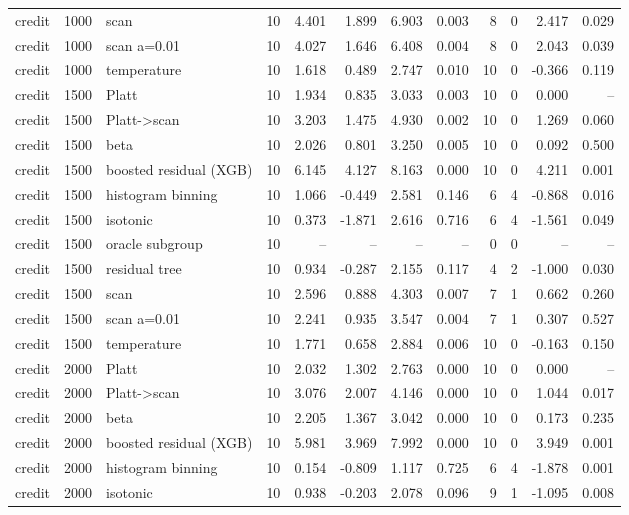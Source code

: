 \begin{tabular}{lllrrrrrrrrr}
credit & 1000 & scan & 10 & 4.401 & 1.899 & 6.903 & 0.003 & 8 & 0 & 2.417 & 0.029 \\
credit & 1000 & scan a=0.01 & 10 & 4.027 & 1.646 & 6.408 & 0.004 & 8 & 0 & 2.043 & 0.039 \\
credit & 1000 & temperature & 10 & 1.618 & 0.489 & 2.747 & 0.010 & 10 & 0 & -0.366 & 0.119 \\
credit & 1500 & Platt & 10 & 1.934 & 0.835 & 3.033 & 0.003 & 10 & 0 & 0.000 & -- \\
credit & 1500 & Platt->scan & 10 & 3.203 & 1.475 & 4.930 & 0.002 & 10 & 0 & 1.269 & 0.060 \\
credit & 1500 & beta & 10 & 2.026 & 0.801 & 3.250 & 0.005 & 10 & 0 & 0.092 & 0.500 \\
credit & 1500 & boosted residual (XGB) & 10 & 6.145 & 4.127 & 8.163 & 0.000 & 10 & 0 & 4.211 & 0.001 \\
credit & 1500 & histogram binning & 10 & 1.066 & -0.449 & 2.581 & 0.146 & 6 & 4 & -0.868 & 0.016 \\
credit & 1500 & isotonic & 10 & 0.373 & -1.871 & 2.616 & 0.716 & 6 & 4 & -1.561 & 0.049 \\
credit & 1500 & oracle subgroup & 10 & -- & -- & -- & -- & 0 & 0 & -- & -- \\
credit & 1500 & residual tree & 10 & 0.934 & -0.287 & 2.155 & 0.117 & 4 & 2 & -1.000 & 0.030 \\
credit & 1500 & scan & 10 & 2.596 & 0.888 & 4.303 & 0.007 & 7 & 1 & 0.662 & 0.260 \\
credit & 1500 & scan a=0.01 & 10 & 2.241 & 0.935 & 3.547 & 0.004 & 7 & 1 & 0.307 & 0.527 \\
credit & 1500 & temperature & 10 & 1.771 & 0.658 & 2.884 & 0.006 & 10 & 0 & -0.163 & 0.150 \\
credit & 2000 & Platt & 10 & 2.032 & 1.302 & 2.763 & 0.000 & 10 & 0 & 0.000 & -- \\
credit & 2000 & Platt->scan & 10 & 3.076 & 2.007 & 4.146 & 0.000 & 10 & 0 & 1.044 & 0.017 \\
credit & 2000 & beta & 10 & 2.205 & 1.367 & 3.042 & 0.000 & 10 & 0 & 0.173 & 0.235 \\
credit & 2000 & boosted residual (XGB) & 10 & 5.981 & 3.969 & 7.992 & 0.000 & 10 & 0 & 3.949 & 0.001 \\
credit & 2000 & histogram binning & 10 & 0.154 & -0.809 & 1.117 & 0.725 & 6 & 4 & -1.878 & 0.001 \\
credit & 2000 & isotonic & 10 & 0.938 & -0.203 & 2.078 & 0.096 & 9 & 1 & -1.095 & 0.008 \\

\end{tabular}
